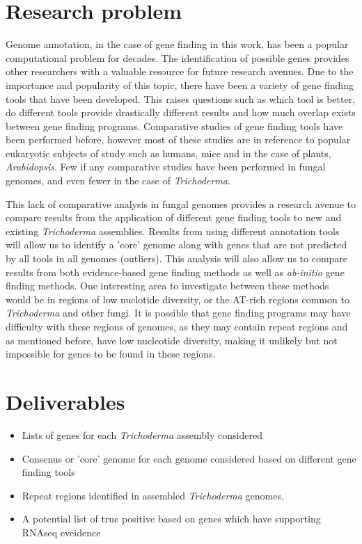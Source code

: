 \documentclass[12pt]{article}
\begin{document}
\section{Research problem}

Genome annotation, in the case of gene finding in this work, has been
a popular computational problem for decades. The identification of
possible genes provides other researchers with a valuable resource for
future research avenues. Due to the importance and popularity of this
topic, there have been a variety of gene finding tools that have been
developed. This raises questions such as which tool is better, do
different tools provide drastically different results and how much
overlap exists between gene finding programs. Comparative studies of
gene finding tools have been performed before, however most of these
studies are in reference to popular eukaryotic subjects of study such
as humans, mice and in the case of plants, \textit{Arabidopsis}. Few
if any comparative studies have been performed in fungal genomes, and
even fewer in the case of \textit{Trichoderma}.

This lack of comparative analysis in fungal genomes provides a
research avenue to compare results from the application of different
gene finding tools to new and existing \textit{Trichoderma}
assemblies. Results from using different annotation tools will allow
us to identify a 'core' genome along with genes that are not predicted
by all tools in all genomes (outliers). This analysis will also allow
us to compare results from both evidence-based gene finding methods as
well as \textit{ab-initio} gene finding methods. One interesting area
to investigate between these methods would be in regions of low
nuclotide diversity, or the AT-rich regions common to
\textit{Trichoderma} and other fungi. It is possible that gene finding
programs may have difficulty with these regions of genomes, as they
may contain repeat regions and as mentioned before, have low
nucleotide diversity, making it unlikely but not impossible for genes
to be found in these regions.

\section{Deliverables}
\begin{itemize}
\item Lists of genes for each \textit{Trichoderma} assembly considered
\item Consenus or 'core' genome for each genome considered based on
  different gene finding tools
\item Repeat regions identified in assembled \textit{Trichoderma}
  genomes.
\item A potential list of true positive based on genes which have
  supporting RNAseq eveidence
\end{itemize}
\end{document}
